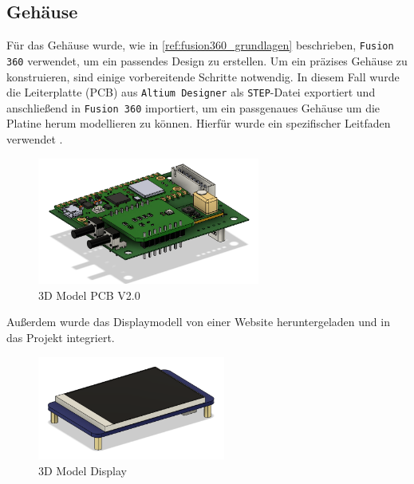 \begin{inhalt}
\renewcommand*\chapterpagestyle{scrheadings}
\chapter{Gehäuse}

Für das Gehäuse wurde, wie in \ref{ref:fusion360_grundlagen} beschrieben, \texttt{Fusion 360} verwendet, um ein passendes Design zu erstellen.  
Um ein präzises Gehäuse zu konstruieren, sind einige vorbereitende Schritte notwendig.  
In diesem Fall wurde die Leiterplatte (PCB) aus \texttt{Altium Designer} als \texttt{STEP}-Datei exportiert und anschließend in \texttt{Fusion 360} importiert,  
um ein passgenaues Gehäuse um die Platine herum modellieren zu können.  
Hierfür wurde ein spezifischer Leitfaden verwendet \cite{artikel_pcb_way}.


\begin{figure}[!htb]
\centering
\includegraphics[width=0.65\textwidth]{files/Thomas/pics/geheause/pcb_fusion.png}
\caption[Bildbezeichnung für Abbildungsverzeichnis]{3D Model PCB V2.0}
\label{fig:pcb_v2}
\end{figure}


Außerdem wurde das Displaymodell von einer Website \cite{3d_display_website} heruntergeladen und in das Projekt integriert.


\begin{figure}[!htb]
\centering
\includegraphics[width=0.55\textwidth]{files/Thomas/pics/geheause/display_fusion.png}
\caption[Bildbezeichnung für Abbildungsverzeichnis]{3D Model Display}
\label{fig:display_3d}
\end{figure}


\end{inhalt}
